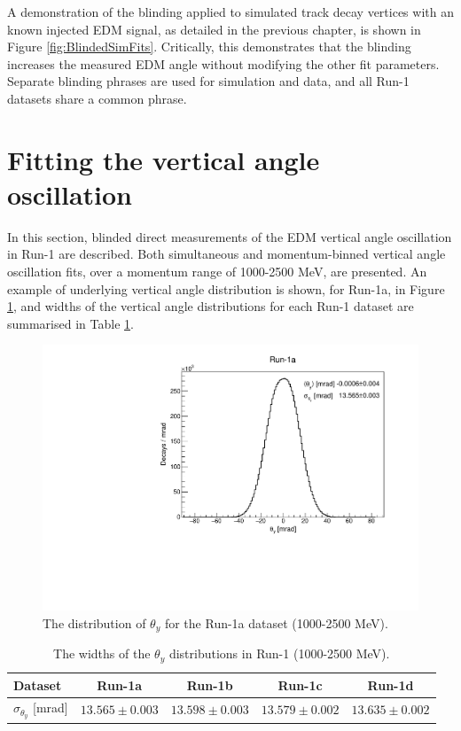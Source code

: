 A demonstration of the blinding applied to simulated track decay vertices with an known injected EDM signal, as detailed in the previous chapter, is shown in Figure \ref{fig:BlindedSimFits}. Critically, this demonstrates that the blinding increases the measured EDM angle without modifying the other fit parameters. Separate blinding phrases are used for simulation and data, and all Run-1 datasets share a common phrase.


\section{Fitting the vertical angle oscillation}\label{sec:Run1Fits}

In this section, blinded direct measurements of the EDM vertical angle oscillation in Run-1 are described. Both simultaneous and momentum-binned vertical angle oscillation fits, over a momentum range of 1000-2500 MeV, are presented. An example of underlying vertical angle distribution is shown, for Run-1a, in Figure \ref{fig:Run1aThetaY}, and widths of the vertical angle distributions for each Run-1 dataset are summarised in Table \ref{tbl:Run1aThetaY}.

\begin{figure}[h!]
\centering{}
\includegraphics[trim={0 0 0 1cm},clip,width=.65\textwidth]{Images/Chapter6/ThetaY_Run-1a.pdf}
\caption{The distribution of $\theta_{y}$ for the Run-1a dataset (1000-2500 MeV).}
\label{fig:Run1aThetaY}
\end{figure} 

\begin{table}[h!]
\centering{}
\begin{tabular}{l|cccc}
\hline
\hline
Dataset & Run-1a & Run-1b & Run-1c & Run-1d \\ 
\hline
$\sigma_{\theta_{y}}$ [mrad] & $13.565\pm0.003$ & $13.598\pm0.003$ & $13.579\pm0.002$ & $13.635\pm0.002$ \\ 
\hline
\hline
\end{tabular}
\caption{The widths of the $\theta_{y}$ distributions in Run-1 (1000-2500 MeV).} 
\label{tbl:Run1aThetaY}
\end{table}

